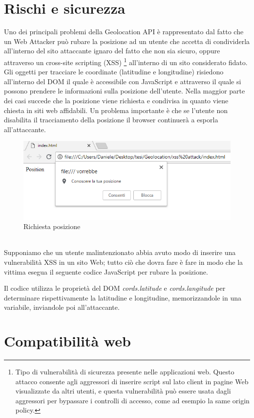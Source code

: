 \documentclass[11pt ,a4paper , twoside , openright ]{book}
\begin{document}
	\section{Rischi e sicurezza} 
	Uno dei principali problemi della Geolocation API \cite{rif6} \cite{rif7} è rappresentato dal fatto che un Web Attacker può rubare la posizione ad un utente che accetta di condividerla all'interno del sito attaccante ignaro del fatto che non sia sicuro, oppure attraverso un cross-site scripting (XSS) \footnote{Tipo di vulnerabilità di sicurezza presente nelle applicazioni web. Questo attacco consente agli aggressori di inserire script sul lato client in pagine Web visualizzate da altri utenti, e questa vulnerabilità può essere usata dagli aggressori per bypassare i controlli di accesso, come ad esempio la same origin policy.} all'interno di un sito considerato fidato. Gli oggetti per tracciare le coordinate (latitudine e longitudine) risiedono all'interno del DOM il quale è accessibile con JavaScript e attraverso il quale si possono prendere le informazioni sulla posizione dell'utente. 
	Nella maggior parte dei casi succede che la posizione viene richiesta e condivisa in quanto viene chiesta in siti web affidabili.
	Un problema importante è che se l'utente non disabilita il tracciamento della posizione il browser continuerà a esporla all'attaccante.
	\begin{figure}[h]
		\centering
		\includegraphics[width=0.5\linewidth]{pos1}
		\caption{Richiesta posizione}
		\label{fig: Richiesta posizione}
	\end{figure}
	\pagebreak
	\\
	Supponiamo che un utente malintenzionato abbia avuto modo di inserire una vulnerabilità XSS in un sito Web; tutto ciò che dovra fare è fare in modo che la vittima esegua il seguente codice JavaScript per rubare la posizione.
	
	Il codice utilizza le proprietà del DOM \textit{cords.latitude} e \textit{cords.langitude} per determinare rispettivamente la latitudine e longitudine, memorizzandole in una variabile, inviandole poi all'attaccante. 
	\\
	\section{Compatibilità web}
\end{document}
